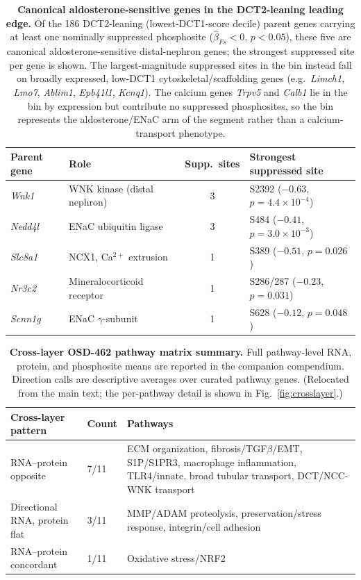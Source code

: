 \documentclass[11pt]{article}
\newcommand{\gene}[1]{\textit{#1}}
\begin{document}
\begin{table}[H]
\centering\small
\caption{\textbf{Canonical aldosterone-sensitive genes in the DCT2-leaning leading edge.} Of the 186 DCT2-leaning (lowest-DCT1-score decile) parent genes carrying at least one nominally suppressed phosphosite ($\hat{\beta}_{Fs}<0$, $p<0.05$), these five are canonical aldosterone-sensitive distal-nephron genes; the strongest suppressed site per gene is shown. The largest-magnitude suppressed sites in the bin instead fall on broadly expressed, low-DCT1 cytoskeletal/scaffolding genes (e.g.\ \gene{Limch1}, \gene{Lmo7}, \gene{Ablim1}, \gene{Epb41l1}, \gene{Kcnq1}). The calcium genes \gene{Trpv5} and \gene{Calb1} lie in the bin by expression but contribute no suppressed phosphosites, so the bin represents the aldosterone/ENaC arm of the segment rather than a calcium-transport phenotype.}
\label{tab:leadingedge}
\begin{tabular}{@{}llcl@{}}
\toprule
Parent gene & Role & Supp.\ sites & Strongest suppressed site \\
\midrule
\gene{Wnk1} & WNK kinase (distal nephron) & 3 & S2392 ($-0.63$, $p=4.4\times10^{-4}$) \\
\gene{Nedd4l} & ENaC ubiquitin ligase & 3 & S484 ($-0.41$, $p=3.0\times10^{-3}$) \\
\gene{Slc8a1} & NCX1, Ca$^{2+}$ extrusion & 1 & S389 ($-0.51$, $p=0.026$) \\
\gene{Nr3c2} & Mineralocorticoid receptor & 1 & S286/287 ($-0.23$, $p=0.031$) \\
\gene{Scnn1g} & ENaC $\gamma$-subunit & 1 & S628 ($-0.12$, $p=0.048$) \\
\bottomrule
\end{tabular}
\end{table}

\begin{table}[H]
\centering\small
\caption{\textbf{Cross-layer OSD-462 pathway matrix summary.} Full pathway-level RNA, protein, and phosphosite means are reported in the companion compendium. Direction calls are descriptive averages over curated pathway genes. (Relocated from the main text; the per-pathway detail is shown in Fig.~\ref{fig:crosslayer}.)}
\label{tab:crosslayer}
\begin{tabularx}{\textwidth}{p{}p{}X}
\toprule
Cross-layer pattern & Count & Pathways \\
\midrule
RNA--protein opposite & 7/11 & ECM organization, fibrosis/TGF$\beta$/EMT, S1P/S1PR3, macrophage inflammation, TLR4/innate, broad tubular transport, DCT/NCC-WNK transport \\
Directional RNA, protein flat & 3/11 & MMP/ADAM proteolysis, preservation/stress response, integrin/cell adhesion \\
RNA--protein concordant & 1/11 & Oxidative stress/NRF2 \\
\bottomrule
\end{tabularx}
\end{table}
\end{document}
